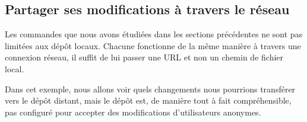 \subsection{Partager ses modifications à travers le réseau}

Les commandes que nous avons étudiées dans les sections précédentes
ne sont pas limitées aux dépôt locaux. Chacune fonctionne de la même
manière à travers une connexion réseau, il suffit de lui passer une 
URL et non un chemin de fichier local.

Dans cet exemple, nous allons voir quels changements nous pourrions
transférer vers le dépôt distant, mais le dépôt est, de manière tout
à fait compréhensible, pas configuré pour accepter des modifications
d'utilisateurs anonymes.

